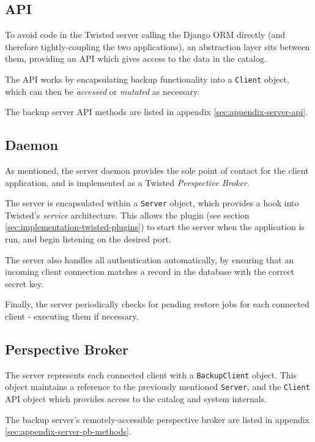 \subsection{API}
\label{sec:implementation-server-api}

To avoid code in the Twisted server calling the Django ORM directly (and
therefore tightly-coupling the two applications), an abstraction layer sits
between them, providing an API which gives access to the data in the catalog.

The API works by encapsulating backup functionality into a \verb!Client!
object, which can then be \emph{accessed} or \emph{mutated} as necessary.

The backup server API methods are listed in appendix
\ref{sec:appendix-server-api}.

\subsection{Daemon}
\label{sec:implementation-server-daemon}

As mentioned, the server daemon provides the sole point of contact for the
client application, and is implemented as a Twisted \emph{Perspective Broker}.

The server is encapsulated within a \verb!Server! object, which provides a hook
into Twisted's \emph{service} architecture. This allows the plugin (see section
\ref{sec:implementation-twisted-plugins}) to start the server when the
application is run, and begin listening on the desired port.

The server also handles all authentication automatically, by ensuring that
an incoming client connection matches a record in the database with the correct
secret key.

Finally, the server periodically checks for pending restore jobs for each
connected client - executing them if necessary.

\subsection{Perspective Broker}
\label{sec:implementation-server-pb}

The server represents each connected client with a \verb!BackupClient! object.
This object maintains a reference to the previously mentioned \verb!Server!,
and the \verb!Client! API object which provides access to the catalog and
system internals.

The backup server's remotely-accessible perspective broker are listed in
appendix \ref{sec:appendix-server-pb-methods}.

